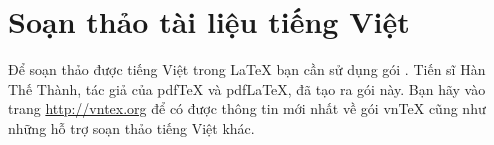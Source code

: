\chapter{Soạn thảo tài liệu tiếng Việt}

Để soạn thảo được tiếng Việt trong \LaTeX{} bạn cần sử dụng gói
. Tiến sĩ Hàn Thế Thành, tác giả của pdf\TeX{} và 
pdf\LaTeX{}, đã tạo ra gói này. Bạn hãy vào trang  
\href{http://vntex.org}{http://vntex.org} 
để có được thông tin mới nhất về gói vn\TeX{} cũng như những hỗ trợ
soạn thảo tiếng Việt khác.

